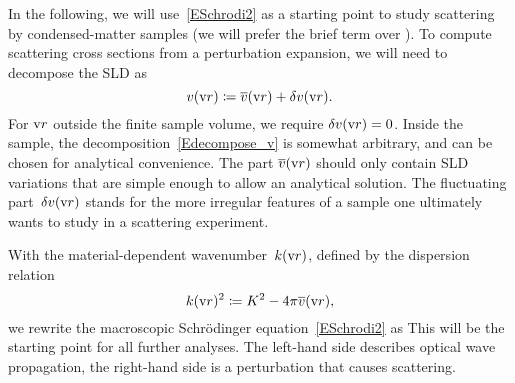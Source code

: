 In the following, we will use~\cref{ESchrodi2}
as a starting point to study scattering by condensed-matter samples
(we will prefer the brief term  over ).
%
%
To compute scattering cross sections from a perturbation expansion,
%
we will need to decompose the SLD as
\begin{equation}\label{Edecompose_v}
  v(\text{v}{r}) \coloneqq \overline{v}(\text{v}{r}) + \delta v(\text{v}{r}).
\end{equation}
%
%
For $\text{v}{r}$ outside the finite sample volume, we require $\delta v(\text{v}{r})=0$.
Inside the sample, the decomposition~\cref{Edecompose_v} is somewhat arbitrary,
and can be chosen for analytical convenience.
The part $\overline{v}(\text{v}{r})$ should only contain SLD variations
that are simple enough to allow an analytical solution.
The fluctuating part~$\delta v(\text{v}{r})$ stands for the more irregular
features of a sample one ultimately wants to study in a scattering experiment.

With the material-dependent wavenumber~$k(\text{v}{r})$,
defined by the dispersion relation
%
%
%
\begin{equation}\label{Edispersion}
  k(\text{v}{r})^2 \coloneqq K^2 - 4\pi\overline{v}(\text{v}{r}),
\end{equation}
we rewrite the macroscopic Schrödinger equation~\cref{ESchrodi2} as
%
%
This  will be the starting point for all further analyses.
The left-hand side describes optical wave propagation,
the right-hand side is a perturbation that causes scattering.
%
%
%

